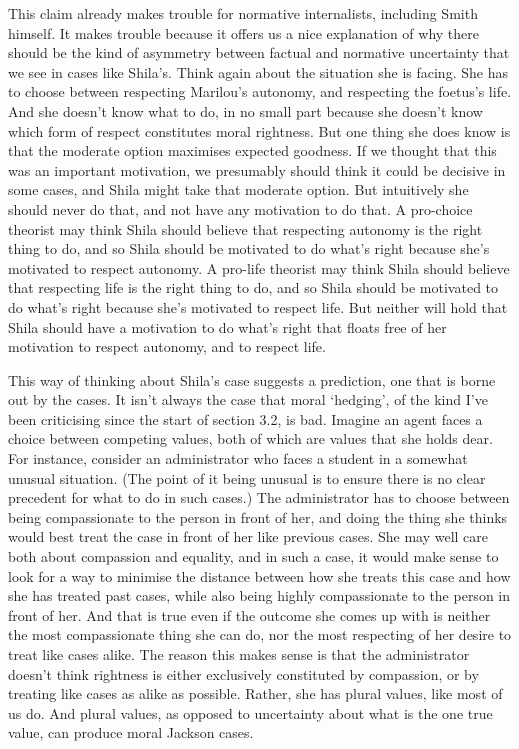 This claim already makes trouble for normative internalists, including Smith himself. It makes trouble because it offers us a nice explanation of why there should be the kind of asymmetry between factual and normative uncertainty that we see in cases like \gls{Shila}'s. Think again about the situation she is facing. She has to choose between respecting \gls{Marilou}'s autonomy, and respecting the foetus's life. And she doesn't know what to do, in no small part because she doesn't know which form of respect constitutes moral rightness. But one thing she does know is that the moderate option maximises expected goodness. If we thought that this was an important motivation, we presumably should think it could be decisive in some cases, and \gls{Shila} might take that moderate option. But intuitively she should never do that, and not have any motivation to do that. A pro-choice theorist may think \gls{Shila} should believe that respecting autonomy is the right thing to do, and so \gls{Shila} should be motivated to do what's right because she's motivated to respect autonomy. A pro-life theorist may think \gls{Shila} should believe that respecting life is the right thing to do, and so \gls{Shila} should be motivated to do what's right because she's motivated to respect life. But neither will hold that \gls{Shila} should have a motivation to do what's right that floats free of her motivation to respect autonomy, and to respect life.

This way of thinking about \gls{Shila}'s case suggests a prediction, one that is borne out by the cases. It isn't always the case that moral `hedging', of the kind I've been criticising since the start of section 3.2, is bad. Imagine an agent faces a choice between competing values, both of which are values that she holds dear. For instance, consider an administrator who faces a student in a somewhat unusual situation. (The point of it being unusual is to ensure there is no clear precedent for what to do in such cases.) The administrator has to choose between being compassionate to the person in front of her, and doing the thing she thinks would best treat the case in front of her like previous cases. She may well care both about compassion and equality, and in such a case, it would make sense to look for a way to minimise the distance between how she treats this case and how she has treated past cases, while also being highly compassionate to the person in front of her. And that is true even if the outcome she comes up with is neither the most compassionate thing she can do, nor the most respecting of her desire to treat like cases alike. The reason this makes sense is that the administrator doesn't think rightness is either exclusively constituted by compassion, or by treating like cases as alike as possible. Rather, she has plural values, like most of us do. And plural values, as opposed to uncertainty about what is the one true value, can produce moral Jackson cases.

